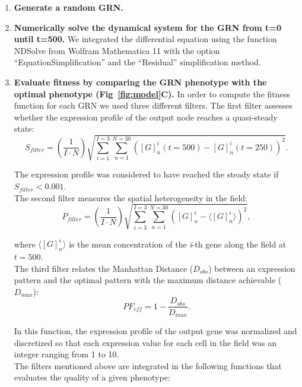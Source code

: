 \documentclass[10pt,letterpaper]{article}
\begin{document}
\begin{enumerate}
 \item{\bf Generate a random GRN.}

 \item{\bf Numerically solve the dynamical system for the GRN from t=0 until
 t=500.} We integrated the differential equation using the function NDSolve from
 Wolfram Mathematica 11 with the option “EquationSimplification” and the
 “Residual” simplification method.

 \item{\bf Evaluate fitness by comparing the GRN phenotype with the optimal
 phenotype (Fig~\ref{fig:model}C).} In order to compute the fitness
 function for each GRN we used three different filters. The first filter
 assesses whether the expression profile of the output node reaches a
 quasi-steady state:
 \begin{equation}
  S_{filter} = \left( \frac{1}{I \cdot N}\right) \sqrt{\sum_{i=1}^{I=3}
  \sum_{n=1}^{N=30} ([G]_n^i(t=500) - [G]^i_n(t=250))^2}.
 \end{equation}

 The expression profile was considered to have reached the steady state if
 $S_{filter} < 0.001$.\\

 The second filter measures the spatial heterogeneity in the field:
 \begin{equation}
  P_{filter} = \left( \frac{1}{I \cdot N} \right) \sqrt{ \sum_{i=3}^{I=3}
  \sum_{n=1}^{N=30} \left( [G]^i_n - \langle [G]^i_n \rangle \right)^2 },
 \end{equation}

 where $\langle [G]^i_n \rangle$ is the mean concentration of the \emph{i}-th
 gene along the field at $t=500$.\\

 The third filter relates the Manhattan Distance ($D_{obs}$) between an
 expression pattern and the optimal pattern with the maximum distance achievable
 ($D_{max}$):
 \begin{equation}
  \mathit{PF}_{eff} = 1 - \frac{D_{obs}}{D_{max}}.
 \end{equation}

 In this function, the expression profile of the output gene was normalized and
 discretized so that each expression value for each cell in the field was an
 integer ranging from 1 to 10.\\

 The filters mentioned above are integrated in the following functions that
 evaluates the  quality of a given phenotype:


\end{enumerate}
\end{document}
